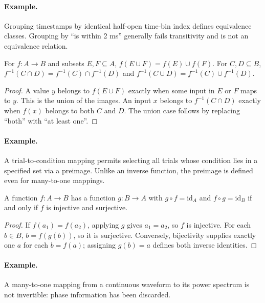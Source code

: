 \paragraph{Example.} Grouping timestamps by identical half-open time-bin index defines equivalence classes. Grouping by ``is within 2 ms'' generally fails transitivity and is not an equivalence relation.



\begin{proposition}For $f:A\to B$ and subsets $E,F\subseteq A$, $f(E\cup F)=f(E)\cup f(F)$. For $C,D\subseteq B$, $f^{-1}(C\cap D)=f^{-1}(C)\cap f^{-1}(D)$ and $f^{-1}(C\cup D)=f^{-1}(C)\cup f^{-1}(D)$.\end{proposition}
\begin{proof}A value $y$ belongs to $f(E\cup F)$ exactly when some input in $E$ or $F$ maps to $y$. This is the union of the images. An input $x$ belongs to $f^{-1}(C\cap D)$ exactly when $f(x)$ belongs to both $C$ and $D$. The union case follows by replacing ``both'' with ``at least one''.\end{proof}
\paragraph{Example.} A trial-to-condition mapping permits selecting all trials whose condition lies in a specified set via a preimage. Unlike an inverse function, the preimage is defined even for many-to-one mappings.



\begin{proposition}A function $f:A\to B$ has a function $g:B\to A$ with $g\circ f=\mathrm{id}_A$ and $f\circ g=\mathrm{id}_B$ if and only if $f$ is injective and surjective.\end{proposition}
\begin{proof}If $f(a_1)=f(a_2)$, applying $g$ gives $a_1=a_2$, so $f$ is injective. For each $b\in B$, $b=f(g(b))$, so it is surjective. Conversely, bijectivity supplies exactly one $a$ for each $b=f(a)$; assigning $g(b)=a$ defines both inverse identities.\end{proof}
\paragraph{Example.} A many-to-one mapping from a continuous waveform to its power spectrum is not invertible: phase information has been discarded.

